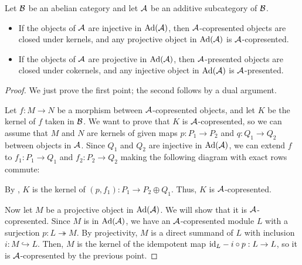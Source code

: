 \begin{proposition}\label{prp:cofp-closed-kernel}
  Let $\mathcal{B}$ be an abelian category and let $\mathcal{A}$ be an additive subcategory of $\mathcal{B}$.
  \begin{itemize}[noitemsep]
  \item If the objects of $\mathcal{A}$ are injective in $\textup{Ad}(\mathcal{A})$, then $\mathcal{A}$-copresented objects are closed under kernels, and any projective object in $\textup{Ad}(\mathcal{A})$ is $\mathcal{A}$-copresented. 
  \item  If the objects of $\mathcal{A}$ are projective in $\textup{Ad}(\mathcal{A})$, then $\mathcal{A}$-presented objects are closed under cokernels, and any injective object in $\textup{Ad}(\mathcal{A})$ is $\mathcal{A}$-presented. 
  \end{itemize}
\end{proposition}

\begin{proof}
  We just prove the first point; the second follows by a dual argument.

  Let $f : M \to N$ be a morphism between $\mathcal{A}$-copresented objects, and let $K$ be the kernel of $f$ taken in $\mathcal{B}$.
  We want to prove that $K$ is $\mathcal{A}$-copresented,
  so we can assume that $M$ and $N$ are kernels of given maps $p : P_1 \to P_2$ and $q : Q_1 \to Q_2$
  between objects in $\mathcal{A}$.
  Since $Q_1$ and $Q_2$ are injective in $\textup{Ad}(\mathcal{A})$, we can extend $f$ to $f_1 : P_1 \to Q_1$ and $f_2 : P_2 \to Q_2$ making the following diagram with exact rows commute:
  \begin{center}
  \end{center}
  By , $K$ is the kernel of $(p, f_1) : P_1 \to P_2 \oplus Q_1$.
  Thus, $K$ is $\mathcal{A}$-copresented.

  Now let $M$ be a projective object in $\textup{Ad}(\mathcal{A})$.  We will show that it is $\mathcal{A}$-copresented.  Since $M$ is in $\textup{Ad}(\mathcal{A})$, we have an $\mathcal{A}$-copresented module $L$ with a surjection $p: L \twoheadrightarrow M$. By projectivity, $M$ is a direct summand of $L$ with inclusion $i : M \hookrightarrow L$.
Then, $M$ is the kernel of the idempotent map $\mathrm{id}_L - i \circ p:L\to L$, so it is $\mathcal{A}$-copresented by the previous point.
\end{proof}

